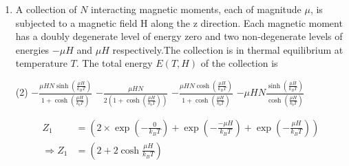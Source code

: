 \begin{enumerate}
	{}
	\begin{tasks}(4)
		\task[\textbf{A.}] $\frac{2 \in^{2}}{3 k_{B} T}$
		\task[\textbf{B.}] $\frac{-2 \in^{2}}{3 k_{B} T}$
		\task[\textbf{C.}] $\frac{-\epsilon^{2}}{k_{B} T}$
	\end{tasks}
	\begin{answer}
		\begin{align*}
		\langle E\rangle&=\frac{-\in e^{+\frac{\epsilon}{k T}}+0+\in e^{-\frac{\epsilon}{k T}}}{e^{\frac{\epsilon}{k T}}+1+e^{-\frac{\epsilon}{k T}}}\\&=\epsilon\left(\frac{e^{-\frac{\epsilon}{k T}}-e^{\frac{\epsilon}{k T}}}{1+e^{-\frac{\epsilon}{k T}}+e^{\frac{\epsilon}{k T}}}\right)\\
		\Rightarrow\langle E\rangle&=\frac{\left[\left(1-\frac{\epsilon}{k T}\right)-\left(1+\frac{\epsilon}{k T}\right)\right]}{1+\left(1-\frac{\epsilon}{k T}\right)+\left(1+\frac{\epsilon}{k T}\right)}\\&=\frac{-2 \epsilon^{2}}{3 k T}
		\end{align*}
		So the correct answer is \textbf{Option (B)}
	\end{answer}	
	\item A collection of $N$ interacting magnetic moments, each of magnitude $\mu$, is subjected to a magnetic field $\mathrm{H}$ along the $\mathrm{z}$ direction. Each magnetic moment has a doubly degenerate level of energy zero and two non-degenerate levels of energies $-\mu H$ and $\mu H$ respectively.The collection is in thermal equilibrium at temperature $T$. The total energy $E(T, H)$ of the collection is
	{}
	\begin{tasks}(2)
		\task[\textbf{A.}] $-\frac{\mu H N \sinh \left(\frac{\mu H}{k_{B} T}\right)}{1+\cosh \left(\frac{\mu H}{k_{b} T}\right)}$
		\task[\textbf{B.}] $-\frac{\mu H N}{2\left(1+\cosh \left(\frac{\mu H}{k_{b} T}\right)\right)}$
		\task[\textbf{C.}] $-\frac{\mu H N \cosh \left(\frac{\mu H}{k_{B} T}\right)}{1+\cosh \left(\frac{\mu H}{k_{b} T}\right)}$
		\task[\textbf{D.}] $-\mu H N \frac{\sinh \left(\frac{\mu H}{k_{B} T}\right)}{\cosh \left(\frac{\mu H}{k_{b} T}\right)}$
	\end{tasks}
	\begin{answer}
		\begin{align*}
		Z_{1}&=\left(2 \times \exp \left(-\frac{0}{k_{B} T}\right)+\exp \left(-\frac{-\mu H}{k_{B} T}\right)+\exp \left(-\frac{\mu H}{k_{B} T}\right)\right) \\\Rightarrow Z_{1}&=\left(2+2 \cosh \frac{\mu H}{k_{B} T}\right)\\

\end{align*}
\end{answer}
\end{enumerate}
